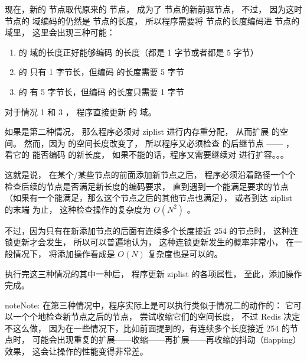 \documentclass[a4paper,11pt,english]{sphinxmanual}
\begin{document}
现在，新的  节点取代原来的  节点，
成为了  节点的新前驱节点，
不过，
因为这时  节点的  域编码的仍然是  节点的长度，
所以程序需要将  节点的长度编码进  节点的  域里，
这里会出现三种可能：
\begin{enumerate}
\item {} 
 的  域的长度正好能够编码  的长度（都是 1 字节或者都是 5 字节）

\item {} 
 的  只有 1 字节长，但编码  的长度需要 5 字节

\item {} 
 的  有 5 字节长，但编码  的长度只需要 1 字节

\end{enumerate}

对于情况 1 和 3 ，
程序直接更新  的  域。

如果是第二种情况，
那么程序必须对 ziplist 进行内存重分配，
从而扩展  的空间。
然而，因为  的空间长度改变了，
所以程序又必须检查  的后继节点 ——  ，
看它的  能否编码  的新长度，
如果不能的话，程序又需要继续对  进行扩容。。。

这就是说，
在某个/某些节点的前面添加新节点之后，
程序必须沿着路径一个个检查后续的节点是否满足新长度的编码要求，
直到遇到一个能满足要求的节点（如果有一个能满足，那么这个节点之后的其他节点也满足），
或者到达 ziplist 的末端  为止，
这种检查操作的复杂度为 $O(N^2)$ 。

不过，因为只有在新添加节点的后面有连续多个长度接近 254 的节点时，
这种连锁更新才会发生，
所以可以普遍地认为，
这种连锁更新发生的概率非常小，
在一般情况下，
将添加操作看成是 $O(N)$ 复杂度也是可以的。

执行完这三种情况的其中一种后，
程序更新 ziplist 的各项属性，
至此，添加操作完成。

\begin{notice}{note}{Note:}
在第三种情况中，程序实际上是可以执行类似于情况二的动作的：
它可以一个个地检查新节点之后的节点，
尝试收缩它们的空间长度，
不过 Redis 决定不这么做，
因为在一些情况下，比如前面提到的，有连续多个长度接近 254 的节点时，
可能会出现重复的扩展——收缩——再扩展——再收缩的抖动（flapping）效果，
这会让操作的性能变得非常差。
\end{notice}
\end{document}

